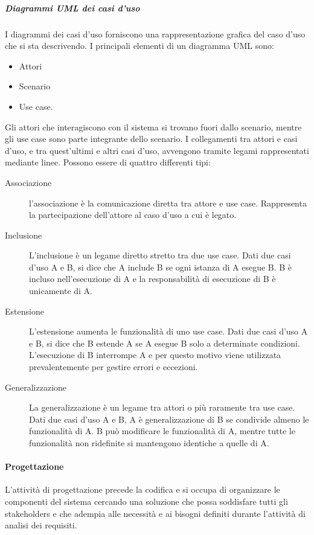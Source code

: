 \documentclass[../../norme-di-progetto.tex]{subfiles}
\begin{document}
\subparagraph{Diagrammi UML dei casi d'uso}%
\label{subp:diagrammi_UML_dei_casi_d'uso}
I diagrammi dei casi d'uso forniscono una rappresentazione grafica del caso d'uso che si sta descrivendo. I principali elementi di un diagramma UML sono:
\begin{itemize}
  \item Attori
  \item Scenario
  \item Use case.
\end{itemize}
Gli attori che interagiscono con il sistema si trovano fuori dallo scenario, mentre gli use case sono parte integrante dello scenario.
I collegamenti tra attori e casi d'uso, e tra quest'ultimi e altri casi d'uso, avvengono tramite legami rappresentati mediante linee.
Possono essere di quattro differenti tipi:
\begin{description}
  \item [Associazione] l'associazione è la comunicazione diretta tra attore e use case. Rappresenta la partecipazione dell'attore al caso d'uso a cui è legato.
  \item [Inclusione] L'inclusione è un legame diretto stretto tra due use case. Dati due casi d'uso A e B, si dice che A include B se ogni istanza di A esegue B. B è incluso nell'esecuzione di A e la responsabilità di esecuzione di B è unicamente di A.
  \item [Estensione] L'estensione aumenta le funzionalità di uno use case. Dati due casi d'uso A e B, si dice che B estende A se A esegue B solo a determinate condizioni. L'esecuzione di B interrompe A e per questo motivo viene utilizzata prevalentemente per gestire errori e eccezioni.
  \item [Generalizzazione] La generalizzazione è un legame tra attori o più raramente tra use case. Dati due casi d'uso A e B, A è generalizzazione di B se condivide almeno le funzionalità di A. B può modificare le funzionalità di A, mentre tutte le funzionalità non ridefinite si mantengono identiche a quelle di A.
\end{description}



\paragraph{Progettazione}%
\label{par:progettazione}
L'attività di progettazione precede la codifica e si occupa di organizzare le componenti del sistema cercando una soluzione che possa soddisfare tutti gli stakeholders e che adempia alle necessità e ai bisogni definiti durante l'attività di analisi dei requisiti.
\end{document}
